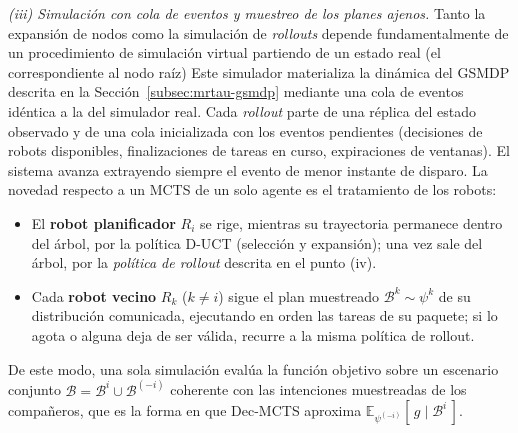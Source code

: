 
\smallskip
\emph{(iii) Simulación con cola de eventos y muestreo de los planes ajenos.}
Tanto la expansión de nodos como la simulación de \textit{rollouts} depende fundamentalmente de un procedimiento de simulación virtual partiendo de un estado real (el correspondiente al nodo raíz)
Este simulador materializa la dinámica del GSMDP descrita en la Sección~\ref{subsec:mrtau-gsmdp} mediante una cola de eventos idéntica a la del simulador real. Cada \textit{rollout} parte de una réplica del estado observado y de una cola inicializada con los eventos pendientes (decisiones de robots disponibles, finalizaciones de tareas en curso, expiraciones de ventanas). El sistema avanza extrayendo siempre el evento de menor instante de disparo. La novedad respecto a un MCTS de un solo agente es el tratamiento de los robots:
\begin{itemize}
    \item El \textbf{robot planificador} $R_i$ se rige, mientras su trayectoria permanece dentro del árbol, por la política D-UCT (selección y expansión); una vez sale del árbol, por la \emph{política de rollout} descrita en el punto (iv).
    \item Cada \textbf{robot vecino} $R_k$ ($k\neq i$) sigue el plan muestreado $\mathcal{B}^{k}\sim \psi^{k}$ de su distribución comunicada, ejecutando en orden las tareas de su paquete; si lo agota o alguna deja de ser válida, recurre a la misma política de rollout.
\end{itemize}
De este modo, una sola simulación evalúa la función objetivo sobre un escenario conjunto $\mathcal{B}=\mathcal{B}^{i}\cup \mathcal{B}^{(-i)}$ coherente con las intenciones muestreadas de los compañeros, que es la forma en que Dec-MCTS aproxima $\mathbb{E}_{\psi^{(-i)}}[\,g\mid \mathcal{B}^{i}\,]$.

